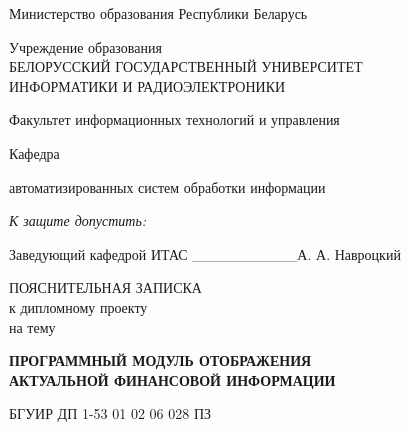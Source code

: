 \thispagestyle{empty}
\setlength{\parindent}{0ex} %

{\centering{}
  Министерство образования Республики Беларусь\par
}

\bigskip
{\centering{}
  Учреждение образования \\
  БЕЛОРУССКИЙ ГОСУДАРСТВЕННЫЙ УНИВЕРСИТЕТ \\
  ИНФОРМАТИКИ И РАДИОЭЛЕКТРОНИКИ
  \par
}

\bigskip
Факультет информационных технологий и управления

\smallskip
\parbox{\widthof{Факультет}}{Кафедра}
автоматизированных систем обработки информации

\vspace{\baselineskip}
\hfill
\begin{minipage}{.4\textwidth}
  {\raggedright{}
    \textit{К защите допустить:}

    \smallskip
    Заведующий кафедрой ИТАС
    \_\_\_\_\_\_\_\_\_\_А. А. Навроцкий\par
  }
\end{minipage}

\vspace{3\baselineskip}

{\centering{}
  ПОЯСНИТЕЛЬНАЯ ЗАПИСКА \\
  к дипломному проекту \\
  на тему\par
}

\bigskip
{\centering{}
  \textbf{ПРОГРАММНЫЙ МОДУЛЬ ОТОБРАЖЕНИЯ \\ АКТУАЛЬНОЙ ФИНАНСОВОЙ ИНФОРМАЦИИ}\par
}

\bigskip
{\centering{}
  БГУИР ДП 1-53 01 02 06 028 ПЗ \par
}

\vspace{3\baselineskip}

